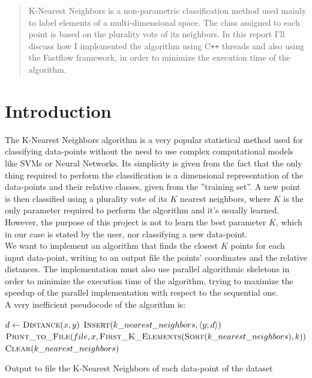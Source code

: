 \documentclass[12pt, letterpaper]{article}  %
\begin{document}
\nocite{*}  %


\newpage

\begin{abstract}
    K-Nearest Neighbors is a non-parametric classification method used mainly to label elements of a multi-dimensional space. The class assigned to each point is based on the plurality vote of its neighbors. In this report I'll discuss how I implemented the algorithm using C\verb!++! threads and also using the Fastflow framework, in order to minimize the execution time of the algorithm.
\end{abstract}

\section{Introduction}

The K-Nearest Neighbors algorithm is a very popular statistical method used for classifying data-points without the need to use complex computational models like SVMs or Neural Networks. Its simplicity is given from the fact that the only thing required to perform the classification is a dimensional representation of the data-points and their relative classes, given from the ''training set''.
A new point is then classified using a plurality vote of its $K$ nearest neighbors, where $K$ is the only parameter required to perform the algorithm and it's usually learned.\\


However, the purpose of this project is not to learn the best parameter $K$, which in our case is stated by the user, nor classifying a new data-point.\\
We want to implement an algorithm that finds the closest $K$ points for each input data-point, writing to an output file the points' coordinates and the relative distances. The implementation must also use parallel algorithmic skeletons in order to minimize the execution time of the algorithm, trying to maximize the speedup of the parallel implementation with respect to the sequential one.\\
A very inefficient pseudocode of the algorithm is: 
\begin{algorithm}
    \begin{algorithmic}
                    \State $d \gets \textsc{Distance}(x, y)$
                    \State $\textsc{Insert}(k\_nearest\_neighbors, \left < y ; d \right >)$
                \EndFor
                \State $\textsc{Print\_to\_File}(file, x, \textsc{First\_K\_Elements}(\textsc{Sort}(k\_nearest\_neighbors), k))$
                \State $\textsc{Clear}(k\_nearest\_neighbors)$
            \EndFor
        \EndFunction
    \end{algorithmic}
    \caption{Output to file the K-Nearest Neighbors of each data-point of the dataset}
    \label{algo:slow_knn}
\end{algorithm}
\end{document}
